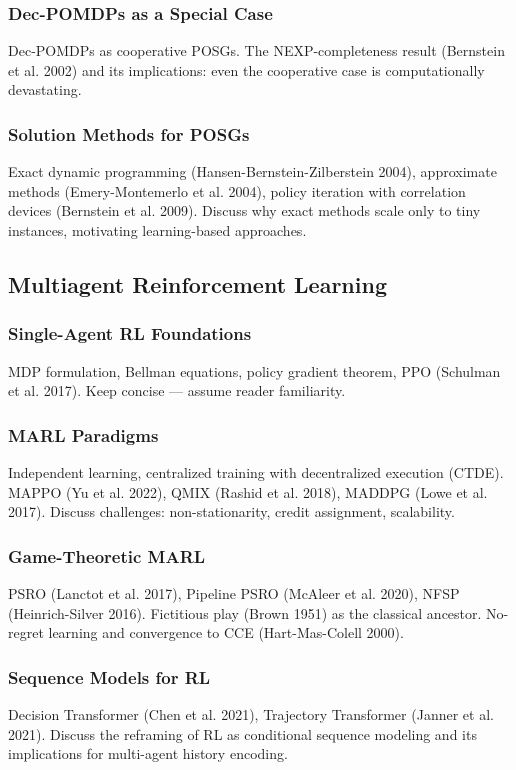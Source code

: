 \subsubsection{Dec-POMDPs as a Special Case}
Dec-POMDPs as cooperative POSGs. The NEXP-completeness result (Bernstein et al. 2002) and its implications: even the cooperative case is computationally devastating.

\subsubsection{Solution Methods for POSGs}
Exact dynamic programming (Hansen-Bernstein-Zilberstein 2004), approximate methods (Emery-Montemerlo et al. 2004), policy iteration with correlation devices (Bernstein et al. 2009). Discuss why exact methods scale only to tiny instances, motivating learning-based approaches.

\subsection{Multiagent Reinforcement Learning}
\subsubsection{Single-Agent RL Foundations}
MDP formulation, Bellman equations, policy gradient theorem, PPO (Schulman et al. 2017). Keep concise — assume reader familiarity.

\subsubsection{MARL Paradigms}
Independent learning, centralized training with decentralized execution (CTDE). MAPPO (Yu et al. 2022), QMIX (Rashid et al. 2018), MADDPG (Lowe et al. 2017). Discuss challenges: non-stationarity, credit assignment, scalability.

\subsubsection{Game-Theoretic MARL}
PSRO (Lanctot et al. 2017), Pipeline PSRO (McAleer et al. 2020), NFSP (Heinrich-Silver 2016). Fictitious play (Brown 1951) as the classical ancestor. No-regret learning and convergence to CCE (Hart-Mas-Colell 2000).

\subsubsection{Sequence Models for RL}
Decision Transformer (Chen et al. 2021), Trajectory Transformer (Janner et al. 2021). Discuss the reframing of RL as conditional sequence modeling and its implications for multi-agent history encoding.

